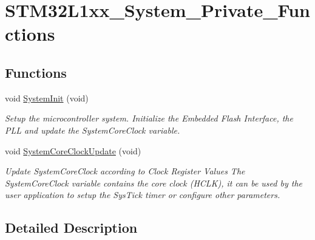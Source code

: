 \hypertarget{group___s_t_m32_l1xx___system___private___functions}{\section{S\-T\-M32\-L1xx\-\_\-\-System\-\_\-\-Private\-\_\-\-Functions}
\label{group___s_t_m32_l1xx___system___private___functions}
}
\subsection*{Functions}
\begin{DoxyCompactItemize}
\item 
void \hyperlink{group___s_t_m32_l1xx___system___private___functions_ga93f514700ccf00d08dbdcff7f1224eb2}{System\-Init} (void)
\begin{DoxyCompactList}\small\item\em Setup the microcontroller system. Initialize the Embedded Flash Interface, the P\-L\-L and update the System\-Core\-Clock variable. \end{DoxyCompactList}\item 
void \hyperlink{group___s_t_m32_l1xx___system___private___functions_gae0c36a9591fe6e9c45ecb21a794f0f0f}{System\-Core\-Clock\-Update} (void)
\begin{DoxyCompactList}\small\item\em Update System\-Core\-Clock according to Clock Register Values The System\-Core\-Clock variable contains the core clock (H\-C\-L\-K), it can be used by the user application to setup the Sys\-Tick timer or configure other parameters. \end{DoxyCompactList}\end{DoxyCompactItemize}


\subsection{Detailed Description}


